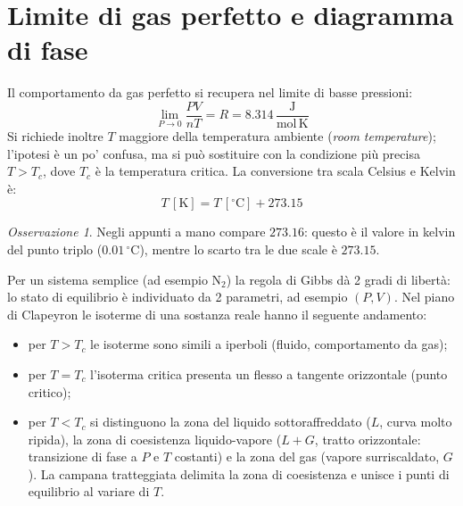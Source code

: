 \documentclass[11pt, a4paper, openright]{book}
\theoremstyle{plain}
\theoremstyle{definition}
\theoremstyle{remark}
\newtheorem{osservazione}[teorema]{Osservazione}
\begin{document}
\section{Limite di gas perfetto e diagramma di fase}
Il comportamento da gas perfetto si recupera nel limite di basse pressioni:
\begin{equation}
    \lim_{P \to 0} \frac{PV}{nT} = R = 8.314\,\frac{\text{J}}{\text{mol}\,\text{K}}
\end{equation}
Si richiede inoltre $T$ maggiore della temperatura ambiente (\emph{room temperature}); l'ipotesi è un po' confusa, ma si può sostituire con la condizione più precisa $T > T_c$, dove $T_c$ è la temperatura critica. La conversione tra scala Celsius e Kelvin è:
\begin{equation}
    T\,[\text{K}] = T\,[^\circ\text{C}] + 273.15
\end{equation}
\begin{osservazione}
    Negli appunti a mano compare $273.16$: questo è il valore in kelvin del punto triplo ($0.01\,^\circ\text{C}$), mentre lo scarto tra le due scale è $273.15$.
\end{osservazione}

Per un sistema semplice (ad esempio $\text{N}_2$) la regola di Gibbs dà 2 gradi di libertà: lo stato di equilibrio è individuato da 2 parametri, ad esempio $(P, V)$. Nel piano di Clapeyron le isoterme di una sostanza reale hanno il seguente andamento:
\begin{itemize}
    \item per $T > T_c$ le isoterme sono simili a iperboli (fluido, comportamento da gas);
    \item per $T = T_c$ l'isoterma critica presenta un flesso a tangente orizzontale (punto critico);
    \item per $T < T_c$ si distinguono la zona del liquido sottoraffreddato ($L$, curva molto ripida), la zona di coesistenza liquido-vapore ($L + G$, tratto orizzontale: transizione di fase a $P$ e $T$ costanti) e la zona del gas (vapore surriscaldato, $G$). La campana tratteggiata delimita la zona di coesistenza e unisce i punti di equilibrio al variare di $T$.
\end{itemize}
\end{document}

